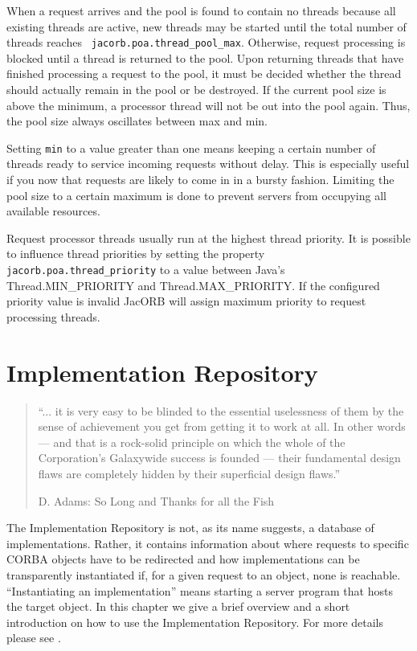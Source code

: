 \documentclass[12pt]{scrbook}
\begin{document}
When a  request arrives and  the pool is  found to contain  no threads
because all  existing threads are  active, new threads may  be started
until     the    total    number     of    threads     reaches    {\tt
jacorb.poa.thread\_pool\_max}. Otherwise,  request processing is blocked
until a  thread is returned to  the pool. Upon  returning threads that
have  finished processing a  request to  the pool,  it must  be decided
whether  the  thread  should  actually   remain  in  the  pool  or  be
destroyed. If the current pool  size is above the minimum, a processor
thread will not be out into the pool again. Thus, the pool size always
oscillates between max and min.

Setting {\tt min} to a value  greater than one means keeping a certain
number  of   threads  ready  to  service   incoming  requests  without
delay. This is  especially useful if you now  that requests are likely
to come  in in a bursty fashion.  Limiting the pool size  to a certain
maximum  is  done to  prevent  servers  from  occupying all  available
resources.

Request  processor   threads  usually   run  at  the   highest  thread
priority. It is possible to influence thread priorities by setting the
property  {\tt jacorb.poa.thread\_priority} to  a value  between Java's
Thread.MIN\_PRIORITY and Thread.MAX\_PRIORITY. If the configured priority
value  is  invalid JacORB  will  assign  maximum  priority to  request
processing threads.




\chapter{Implementation Repository}
\label{Ch_Imr}

\begin{quote}
``...  it is  very easy to be blinded to  the essential uselessness of
them by  the sense of achievement you  get from getting it  to work at
all.  In other  words --- and that is a  rock-solid principle on which
the whole of the Corporation's Galaxywide success is founded --- their
fundamental design  flaws are  completely hidden by  their superficial
design flaws.''
    
             D. Adams: So Long and Thanks for all the Fish
\end{quote}

The Implementation Repository is not, as its name suggests, a database
of  implementations.   Rather,  it  contains information  about  where
requests  to specific  CORBA objects  have  to be  redirected and  how
implementations  can be  transparently  instantiated if,  for a  given
request  to   an  object,  none  is   reachable.   ``Instantiating  an
implementation'' means starting a server program that hosts the target
object.  In  this  chapter  we  give  a brief  overview  and  a  short
introduction  on how to  use the  Implementation Repository.  For more
details please see \cite{Henning1999}.
\end{document}
